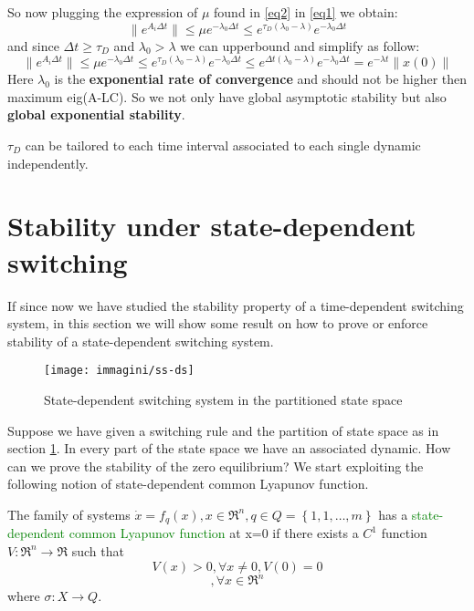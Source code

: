 So now plugging the expression of $\mu$ found in \ref{eq2} in \ref{eq1} we obtain:
\begin{equation} \label{eq3}
	\|e^{A_i\Delta t}\| \le \mu e^{-\lambda_0\Delta t}\le e^{\tau_D(\lambda_0-\lambda)}e^{-\lambda_0\Delta t}
\end{equation}
and since $\Delta t \ge \tau_D$ and $\lambda_0 > \lambda$ we can upperbound and simplify as follow:
\begin{equation}
 		\|e^{A_i\Delta t}\| \le \mu e^{-\lambda_0\Delta t}\le e^{\tau_D(\lambda_0-\lambda)}e^{-\lambda_0\Delta t} \le e^{\Delta t(\lambda_0-\lambda)}e^{-\lambda_0\Delta t}=\boxed{e^{-\lambda t}\|x(0)\|}
\end{equation}
Here $\lambda_0$ is the \textbf{exponential rate of convergence} and should not be higher then maximum eig(A-LC). So we not only have global asymptotic stability but also \textbf{global exponential stability}.
\begin{remark}
	$\tau_D$ can be tailored to each time interval associated to each single dynamic independently.
\end{remark}
\section{Stability under state-dependent switching}
If since now we have studied the stability property of a time-dependent switching system, in this section we will show some result on how to prove or enforce stability of a state-dependent switching system.
\linebreak[2]
\begin{figure}[H]
	\centering
	\texttt{[image: immagini/ss-ds]}
	\caption{State-dependent switching system in the partitioned state space}
	\label{fig:ss-ds}
\end{figure}
Suppose we have given a switching rule and the partition of state space as in section \ref{fig:ss-ds}. In every part of the state space we have an associated dynamic. How can we prove the stability of the zero equilibrium? We start exploiting the following notion of state-dependent common Lyapunov function.
\begin{defn}
	The family of systems $\dot{x}=f_q(x), x \in \Re^n, q \in Q=\left\{1,1,\dots,m\right\}$ has a \textcolor{green}{state-dependent common Lyapunov function} at x=0 if there exists a $C^1$ function $V\colon \Re^n\to\Re$ such that
	\[
	V(x)>0, \forall x\neq 0, V(0)=0	
	\]
	\[
		, \forall x \in \Re^n
	\]
	where $\sigma\colon X \to Q$.
\end{defn}

